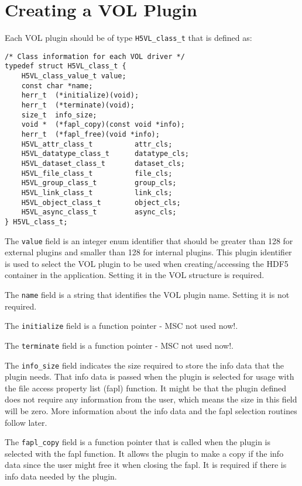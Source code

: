 \section{Creating a VOL Plugin}
Each VOL plugin should be of type {\tt H5VL\_class\_t} that is defined
as:

\begin{lstlisting}
/* Class information for each VOL driver */
typedef struct H5VL_class_t {
    H5VL_class_value_t value;
    const char *name;
    herr_t  (*initialize)(void);
    herr_t  (*terminate)(void);
    size_t  info_size;
    void *  (*fapl_copy)(const void *info);
    herr_t  (*fapl_free)(void *info);
    H5VL_attr_class_t          attr_cls;
    H5VL_datatype_class_t      datatype_cls;
    H5VL_dataset_class_t       dataset_cls;
    H5VL_file_class_t          file_cls;
    H5VL_group_class_t         group_cls;
    H5VL_link_class_t          link_cls;
    H5VL_object_class_t        object_cls;
    H5VL_async_class_t         async_cls;
} H5VL_class_t;
\end{lstlisting}

The {\tt value} field is an integer enum identifier that should be
greater than 128 for external plugins and smaller than 128 for
internal plugins. This plugin identifier is used to select the VOL
plugin to be used when creating/accessing the HDF5 container in the
application. Setting it in the VOL structure is required.

The {\tt name} field is a string that identifies the VOL plugin
name. Setting it is not required.

The {\tt initialize} field is a function pointer - MSC not used now!.

The {\tt terminate} field is a function pointer - MSC not used now!.

The {\tt info\_size} field indicates the size required to store the
info data that the plugin needs. That info data is passed when the
plugin is selected for usage with the file access property list (fapl)
function. It might be that the plugin defined does not require any
information from the user, which means the size in this field will be
zero. More information about the info data and the fapl selection
routines follow later.

The {\tt fapl\_copy} field is a function pointer that is called when
the plugin is selected with the fapl function. It allows the plugin to
make a copy if the info data since the user might free it when closing
the fapl. It is required if there is info data needed by the plugin.


